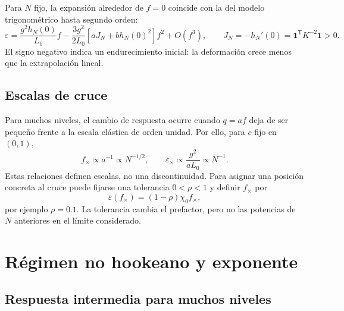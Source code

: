 \documentclass[11pt,a4paper]{article}
\begin{document}
Para $N$ fijo, la expansión alrededor de $f=0$ coincide con la del
modelo trigonométrico hasta segundo orden:
\begin{equation}
\varepsilon=\frac{g^2h_N(0)}{L_0}f
-\frac{3g^2}{2L_0}
\left[aJ_N+b h_N(0)^2\right]f^2+O(f^3),
\qquad J_N=-h_N'(0)=\mathbf1^{\mathsf T}K^{-2}\mathbf1>0.
\label{eq:strain_low_force}
\end{equation}
El signo negativo indica un endurecimiento inicial: la deformación
crece menos que la extrapolación lineal.

\subsection{Escalas de cruce}

Para muchos niveles, el cambio de respuesta ocurre cuando $q=af$
deja de ser pequeño frente a la escala elástica de orden unidad.
Por ello, para $c$ fijo en $(0,1)$,
\begin{equation}
\boxed{
f_\times\propto a^{-1}\propto N^{-1/2},
\qquad \varepsilon_\times\propto\frac{g^2}{aL_0}\propto N^{-1}.
}
\label{eq:crossover_scaling}
\end{equation}
Estas relaciones definen escalas, no una discontinuidad. Para
asignar una posición concreta al cruce puede fijarse una tolerancia
$0<\rho<1$ y definir $f_\times$ por
\begin{equation}
\varepsilon(f_\times)=(1-\rho)\chi_0f_\times,
\label{eq:crossover_criterion}
\end{equation}
por ejemplo $\rho=0.1$. La tolerancia cambia el prefactor, pero no
las potencias de $N$ anteriores en el límite considerado.

\section{Régimen no hookeano y exponente}
\label{sec:modal_response}

\subsection{Respuesta intermedia para muchos niveles}
\end{document}
